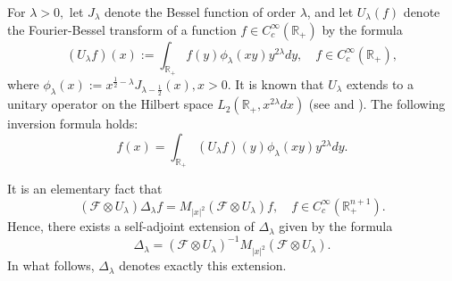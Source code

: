 \documentclass[12pt]{amsart}
\begin{document}
For $\lambda>0,$ let $J_\lambda$ denote the Bessel function of order $\lambda$, and let $U_{\lambda}(f)$ denote the Fourier-Bessel transform of a function $f\in C^{\infty}_c(\mathbb{R}_+)$ by the formula
$$(U_{\lambda}f)(x):=\int_{\mathbb{R}_+}f(y)\phi_\lambda(xy)y^{2\lambda}dy,\quad f\in C^{\infty}_c(\mathbb{R}_+),$$
where
$\phi_\lambda(x):=x^{\frac12-\lambda}J_{\lambda-\frac12}(x), x>0.$
It is known that $U_{\lambda}$ extends to a unitary operator on the Hilbert space $L_2(\mathbb{R}_+,x^{2\lambda}dx)$ (see \cite{MS} and \cite[Proposition 2.5]{MTaylor}). The following inversion formula holds:
$$f(x)=\int_{\mathbb{R}_+} (U_{\lambda}f)(y)\phi_{\lambda}(xy)y^{2\lambda}dy.$$


It is an elementary fact that
$$(\mathcal{F}\otimes U_{\lambda})\Delta_{\lambda}f=M_{|x|^2}(\mathcal{F}\otimes U_{\lambda})f,\quad f\in C^{\infty}_c(\mathbb{R}_+^{n+1}).$$
Hence, there exists a self-adjoint extension of $\Delta_{\lambda}$ given by the formula
$$\Delta_{\lambda}=(\mathcal{F}\otimes U_{\lambda})^{-1}M_{|x|^2}(\mathcal{F}\otimes U_{\lambda}).$$
In what follows, $\Delta_{\lambda}$ denotes exactly this extension.
\end{document}
